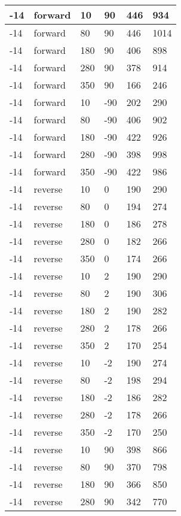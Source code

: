 \begin{table}
\begin{center}
\begin{tabular}{|l|l|l|l|l|l|}
			\hline
			-14 & forward & 10 & 90 & 446 & 934 \\
			\hline
			-14 & forward & 80 & 90 & 446 & 1014 \\
			\hline
			-14 & forward & 180 & 90 & 406 & 898 \\
			\hline
			-14 & forward & 280 & 90 & 378 & 914 \\
			\hline
			-14 & forward & 350 & 90 & 166 & 246 \\
			\hline
			-14 & forward & 10 & -90 & 202 & 290 \\
			\hline
			-14 & forward & 80 & -90 & 406 & 902 \\
			\hline
			-14 & forward & 180 & -90 & 422 & 926 \\
			\hline
			-14 & forward & 280 & -90 & 398 & 998 \\
			\hline
			-14 & forward & 350 & -90 & 422 & 986 \\
			\hline
			-14 & reverse & 10 & 0 & 190 & 290 \\
			\hline
			-14 & reverse & 80 & 0 & 194 & 274 \\
			\hline
			-14 & reverse & 180 & 0 & 186 & 278 \\
			\hline
			-14 & reverse & 280 & 0 & 182 & 266 \\
			\hline
			-14 & reverse & 350 & 0 & 174 & 266 \\
			\hline
			-14 & reverse & 10 & 2 & 190 & 290 \\
			\hline
			-14 & reverse & 80 & 2 & 190 & 306 \\
			\hline
			-14 & reverse & 180 & 2 & 190 & 282 \\
			\hline
			-14 & reverse & 280 & 2 & 178 & 266 \\
			\hline
			-14 & reverse & 350 & 2 & 170 & 254 \\
			\hline
			-14 & reverse & 10 & -2 & 190 & 274 \\
			\hline
			-14 & reverse & 80 & -2 & 198 & 294 \\
			\hline
			-14 & reverse & 180 & -2 & 186 & 282 \\
			\hline
			-14 & reverse & 280 & -2 & 178 & 266 \\
			\hline
			-14 & reverse & 350 & -2 & 170 & 250 \\
			\hline
			-14 & reverse & 10 & 90 & 398 & 866 \\
			\hline
			-14 & reverse & 80 & 90 & 370 & 798 \\
			\hline
			-14 & reverse & 180 & 90 & 366 & 850 \\
			\hline
			-14 & reverse & 280 & 90 & 342 & 770 \\

\end{tabular}
\end{center}
\end{table}
